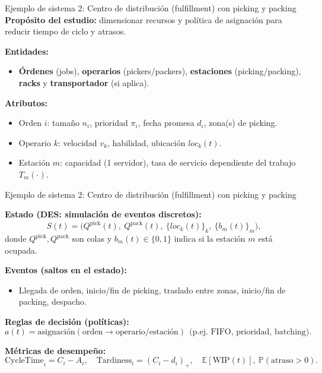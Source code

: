 \documentclass[aspectratio=1610, 9pt]{beamer}
\begin{document}
\begin{frame}{Ejemplo de sistema 2: Centro de distribución (fulfillment) con picking y packing}
\textbf{Propósito del estudio:} dimensionar recursos y política de asignación para reducir tiempo de ciclo y atrasos.

\medskip
\textbf{Entidades:}
\begin{itemize}
  \item \textbf{Órdenes} (jobs), \textbf{operarios} (pickers/packers), \textbf{estaciones} (picking/packing), \textbf{racks} y \textbf{transportador} (si aplica).
\end{itemize}

\textbf{Atributos:}
\begin{itemize}
  \item Orden $i$: tamaño $n_i$, prioridad $\pi_i$, fecha promesa $d_i$, zona(s) de picking.
  \item Operario $k$: velocidad $v_k$, habilidad, ubicación $loc_k(t)$.
  \item Estación $m$: capacidad (1 servidor), tasa de servicio dependiente del trabajo $T_m(\cdot)$.
\end{itemize}

\end{frame}


\begin{frame}{Ejemplo de sistema 2: Centro de distribución (fulfillment) con picking y packing}

\textbf{Estado (DES: simulación de eventos discretos):}
\[
S(t)=\Big(Q^{\text{pick}}(t),\ Q^{\text{pack}}(t),\ \{loc_k(t)\}_k,\ \{b_m(t)\}_m\Big),
\]
donde $Q^{\text{pick}},Q^{\text{pack}}$ son colas y $b_m(t)\in\{0,1\}$ indica si la estación $m$ está ocupada.

\textbf{Eventos (saltos en el estado):}
\begin{itemize}
  \item Llegada de orden, inicio/fin de picking, traslado entre zonas, inicio/fin de packing, despacho.
\end{itemize}

\textbf{Reglas de decisión (políticas):}
\[
a(t)=\text{asignación}( \text{orden}\rightarrow \text{operario/estación})\ \ \text{(p.ej.\ FIFO, prioridad, batching)}.
\]

\textbf{Métricas de desempeño:}
\[
\text{CycleTime}_i = C_i - A_i,\quad \text{Tardiness}_i=(C_i-d_i)_+,\quad
\mathbb E[\text{WIP}(t)],\ \mathbb P(\text{atraso}>0).
\]
\end{frame}
\end{document}

